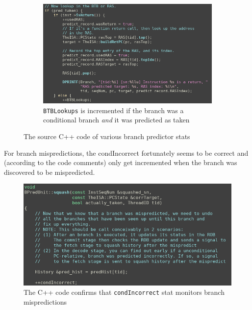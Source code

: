 \begin{figure}[H]
\begin{subfigure}{0.55\linewidth}
            \centering
            \includegraphics[width=\linewidth]{screenshots/br-pred/br-pred-pmu-0x12-if-pred-taken.png}
            \caption{\texttt{BTBLookups} is incremented if the branch was a
                     conditional branch \emph{and} it was predicted as taken}
            \label{subfig:bp-btblookups-correct}
        \end{subfigure}
        \caption{The source C++ code of various branch predictor stats}
    \end{figure}
    For branch mispredictions, the \textsf{condIncorrect} fortunately seems to 
    be correct and (according to the code comments) only get incremented when 
    the branch was discovered to be mispredicted.
    \begin{figure}[H]
        \centering
        \includegraphics[width=0.55\linewidth]{screenshots/br-pred/br-pred-pmu-0x10-condIncorrect-src.png}
        \caption{The C++ code confirms that \texttt{condIncorrect} stat 
                 monitors branch mispredictions}
    \end{figure}

